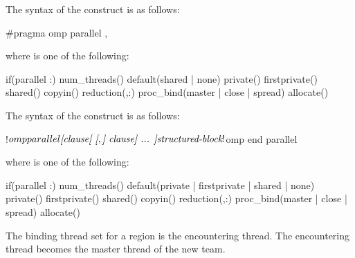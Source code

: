 \syntax
\begin{ccppspecific}
The syntax of the  construct is as follows:
\begin{ompcPragma}
#pragma omp parallel \plc{[clause[ [},\plc{] clause] ... ] new-line}
\end{ompcPragma}

where  is one of the following:

{}
\begin{indentedcodelist}
if(\plc{[}parallel :\plc{] scalar-expression})
num_threads()
default(shared \textnormal{|} none)
private()
firstprivate()
shared()
copyin()
reduction(\plc{[ reduction-modifier},\plc{]reduction-identifier }:)
proc_bind(master \textnormal{|} close \textnormal{|} spread)
allocate(\plc{[allocator: ]})
\end{indentedcodelist}
\end{ccppspecific}

\begin{fortranspecific}
The syntax of the  construct is as follows:

\begin{ompfPragma}
!$omp parallel \plc{[clause[ [},\plc{] clause] ... ]}
   \plc{structured-block}
!$omp end parallel
\end{ompfPragma}

\begin{samepage}
where  is one of the following:

{}
\begin{indentedcodelist}
if(\plc{[}parallel :\plc{] scalar-logical-expression})
num_threads()
default(private \textnormal{|} firstprivate \textnormal{|} shared \textnormal{|} none)
private()
firstprivate()
shared()
copyin()
reduction(\plc{[ reduction-modifier},\plc{]reduction-identifier }:)
proc_bind(master \textnormal{|} close \textnormal{|} spread)
allocate(\plc{[allocator: ]})
\end{indentedcodelist}
\end{samepage}

\end{fortranspecific}

\binding
The binding thread set for a  region is the encountering thread. The
encountering thread becomes the master thread of the new team.

